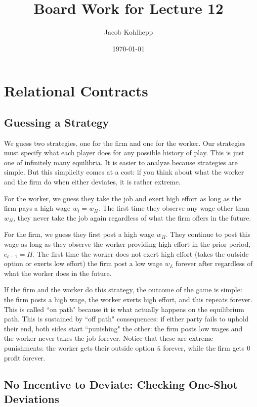 \documentclass[14pt]{article}
\title{Board Work for Lecture 12}
\author{Jacob Kohlhepp}
\date{\today}
\begin{document}
\maketitle


\section{Relational Contracts}

\subsection{Guessing a Strategy}

We guess two strategies, one for the firm and one for the worker. Our strategies must specify what each player does for any possible history of play. This is just one of infinitely many equilibria. It is easier to analyze because strategies are simple. But this simplicity comes at a cost: if you think about what the worker and the firm do when either deviates, it is rather extreme.

For the worker, we guess they take the job and exert high effort as long as the firm pays a high wage $w_t=w_H$. The first time they  observe any wage other than $w_H$, they never take the job again regardless of what the firm offers in the future.

For the firm, we guess they first post a high wage $w_H$. They continue to post this wage as long as they observe the worker providing high effort in the prior period, $e_{t-1}=H$. The first time the worker does not exert high effort (takes the outside option or exerts low effort) the firm post a low wage $w_L$ forever after regardless of what the worker does in the future.

If the firm and the worker do this strategy, the outcome of the game is simple: the firm posts a high wage, the worker exerts high effort, and this repeats forever. This is called ``on path" because it is what actually happens on the equilibrium path. This is sustained by ``off path" consequences: if either party fails to uphold their end, both sides start ``punishing" the other: the firm posts low wages and the worker never takes the job forever. Notice that these are extreme punishments: the worker gets their outside option $\bar u$ forever, while the firm gets $0$ profit forever.




\subsection{No Incentive to Deviate: Checking One-Shot Deviations}
\end{document}

